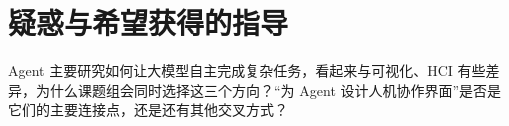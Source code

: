 \documentclass[UTF8,a4paper,11pt,fontset=fandol]{ctexart}
\begin{document}
\section{疑惑与希望获得的指导}
Agent 主要研究如何让大模型自主完成复杂任务，看起来与可视化、HCI 有些差异，为什么课题组会同时选择这三个方向？“为 Agent 设计人机协作界面”是否是它们的主要连接点，还是还有其他交叉方式？
\end{document}
